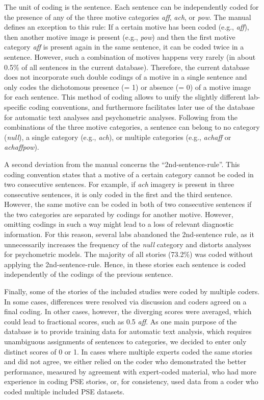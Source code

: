 \documentclass[jou,a4paper]{apa6}\usepackage[]{graphicx}\usepackage[]{color}
\begin{document}
The unit of coding is the sentence. Each sentence can be independently coded for the presence of any of the three motive categories \emph{aff}, \emph{ach}, or \emph{pow}. The manual defines an exception to this rule: If a certain motive has been coded (e.g., \emph{aff}), then another motive image is present (e.g., \emph{pow}) and then the first motive category \emph{aff} is present again in the same sentence, it can be coded twice in a sentence. However, such a combination of motives happens very rarely (in about 0.5\% of all sentences in the current database). Therefore, the current database does not incorporate such double codings of a motive in a single sentence and only codes the dichotomous presence (= 1) or absence (= 0) of a motive image for each sentence. This method of coding allows to unify the slightly different lab-specific coding conventions, and furthermore facilitates later use of the database for automatic text analyses and psychometric analyses. 
Following from the combinations of the three motive categories, a sentence can belong to no category (\emph{null}), a single category (e.g., \emph{ach}), or multiple categories (e.g., \emph{achaff} or \emph{achaffpow}).

A second deviation from the manual concerns the ``2nd-sentence-rule''. This coding convention states that a motive of a certain category cannot be coded in two consecutive sentences. For example, if \emph{ach} imagery is present in three consecutive sentences, it is only coded in the first and the third sentence. However, the same motive can be coded in both of two consecutive sentences if the two categories are separated by codings for another motive. 
However, omitting codings in such a way might lead to a loss of relevant diagnostic information. For this reason, several labs abandoned the 2nd-sentence rule, as it unnecessarily increases the frequency of the \emph{null} category and distorts analyses for psychometric models. The majority of all stories (73.2\%) was coded without applying the 2nd-sentence-rule. Hence, in these stories each sentence is coded independently of the codings of the previous sentence.

Finally, some of the stories of the included studies were coded by multiple coders. In some cases, differences were resolved via discussion and coders agreed on a final coding. In other cases, however, the diverging scores were averaged, which could lead to fractional scores, such as 0.5 \emph{aff}. As one main purpose of the database is to provide training data for automatic text analysis, which requires unambiguous assignments of sentences to categories, we decided to enter only distinct scores of 0 or 1. In cases where multiple experts coded the same stories and did not agree, we either relied on the coder who demonstrated the better performance, measured by agreement with expert-coded material, who had more experience in coding PSE stories, or, for consistency, used data from a coder who coded multiple included PSE datasets.
\end{document}

